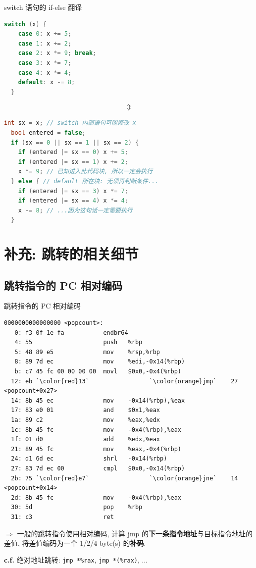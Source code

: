 \documentclass{ctexbeamer}
\begin{document}
\begin{frame}[fragile, shrink=5]{switch 语句的 if-else 翻译}
  \begin{lstlisting}[language=C]
  switch (x) {
    case 0: x += 5;
    case 1: x += 2;
    case 2: x *= 9; break;
    case 3: x *= 7;
    case 4: x *= 4;
    default: x -= 8;
  }
  \end{lstlisting}

  $$
    \Updownarrow
  $$

  \begin{lstlisting}[language=C++]
  int sx = x; // switch 内部语句可能修改 x
  bool entered = false;
  if (sx == 0 || sx == 1 || sx == 2) {
    if (entered |= sx == 0) x += 5;
    if (entered |= sx == 1) x += 2;
    x *= 9; // 已知进入此代码块, 所以一定会执行
  } else { // default 所在块: 无须再判断条件...
    if (entered |= sx == 3) x *= 7;
    if (entered |= sx == 4) x *= 4;
    x -= 8; // ...因为这句话一定需要执行
  }
  \end{lstlisting}
\end{frame}

\section{补充: 跳转的相关细节}

\subsection*{跳转指令的 PC 相对编码}

\begin{frame}[fragile,shrink=30]{跳转指令的 PC 相对编码}
  \begin{lstlisting}[language=x86_64]
0000000000000000 <popcount>:
   0: f3 0f 1e fa           endbr64 
   4: 55                    push   %rbp
   5: 48 89 e5              mov    %rsp,%rbp
   8: 89 7d ec              mov    %edi,-0x14(%rbp)
   b: c7 45 fc 00 00 00 00  movl   $0x0,-0x4(%rbp)
  12: eb `\color{red}13`                 `\color{orange}jmp`    27 <popcount+0x27>
  14: 8b 45 ec              mov    -0x14(%rbp),%eax
  17: 83 e0 01              and    $0x1,%eax
  1a: 89 c2                 mov    %eax,%edx
  1c: 8b 45 fc              mov    -0x4(%rbp),%eax
  1f: 01 d0                 add    %edx,%eax
  21: 89 45 fc              mov    %eax,-0x4(%rbp)
  24: d1 6d ec              shrl   -0x14(%rbp)
  27: 83 7d ec 00           cmpl   $0x0,-0x14(%rbp)
  2b: 75 `\color{red}e7`                 `\color{orange}jne`    14 <popcount+0x14>
  2d: 8b 45 fc              mov    -0x4(%rbp),%eax
  30: 5d                    pop    %rbp
  31: c3                    ret
  \end{lstlisting}

  \pause
  \qquad $\Longrightarrow$ 一般的跳转指令使用相对编码, 计算 jmp 的\textbf{下一条指令地址}与目标指令地址的差值, 将差值编码为一个 1/2/4 byte(s) 的\textbf{补码}.

  \pause
  \qquad \textbf{c.f.} 绝对地址跳转: \texttt{jmp  *\%rax}, \texttt{jmp  *(\%rax)}, ...
\end{frame}
\end{document}

